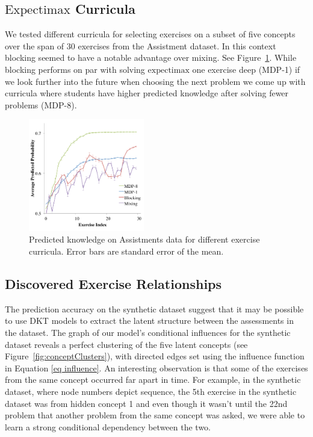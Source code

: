 \subsection{$\mathrm{Expectimax}$ Curricula}\label{sec expectimax}

We tested different curricula for selecting exercises on a subset of five concepts over the span of 30 exercises from the Assistment dataset. In this context blocking seemed to have a notable advantage over mixing. See Figure~\ref{fig:curriculum}. While blocking performs on par with solving $\mathrm{expectimax}$ one exercise deep (MDP-1) if we look further into the future when choosing the next problem we come up with curricula where students have higher predicted knowledge after solving fewer problems (MDP-8). 

\begin{figure}
 \centering
 \includegraphics[width=0.45\textwidth]{img/curriculum}
 \caption[Curriculum evaluation]{Predicted knowledge on Assistments data for different exercise curricula. Error bars are standard error of the mean.}
 \label{fig:curriculum}
\end{figure}

\subsection{Discovered Exercise Relationships}\label{sec ex rel}



The prediction accuracy on the synthetic dataset suggest that it may be possible to use DKT models to extract the latent structure between the assessments in the dataset. The graph of our model's conditional influences for the synthetic dataset reveals a perfect clustering of the five latent concepts (see Figure~\ref{fig:conceptClusters}),
with directed edges set using the influence function in Equation \ref{eq influence}.
An interesting observation is that some of the exercises from the same concept occurred far apart in time. For example, in the synthetic dataset, where node numbers depict sequence, the 5th exercise in the synthetic dataset was from hidden concept 1 and even though it wasn't until the 22nd problem that another problem from the same concept was asked, we were able to learn a strong conditional dependency between the two.


